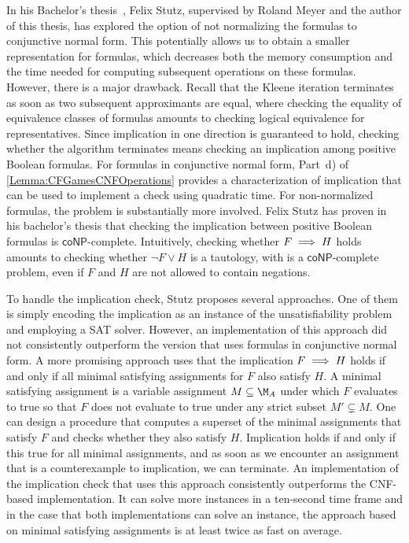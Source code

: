 \documentclass[../../diss.tex]{subfiles}
\begin{document}
In his Bachelor's thesis~\cite{Stutz17}, Felix Stutz, supervised by Roland Meyer and the author of this thesis, has explored the option of not normalizing the formulas to conjunctive normal form.
This potentially allows us to obtain a smaller representation for formulas, which decreases both the memory consumption and the time needed for computing subsequent operations on these formulas.
However, there is a major drawback.
Recall that the Kleene iteration terminates as soon as two subsequent approximants are equal, where checking the equality of equivalence classes of formulas amounts to checking logical equivalence for representatives.
Since implication in one direction is guaranteed to hold, checking whether the algorithm terminates means checking an implication among positive Boolean formulas.
For formulas in conjunctive normal form, Part~d) of \cref{Lemma:CFGamesCNFOperations} provides a characterization of implication that can be used to implement a check using quadratic time.
For non-normalized formulas, the problem is substantially more involved.
Felix Stutz has proven in his bachelor's thesis that checking the implication between positive Boolean formulas is $\mathsf{coNP}$-complete.
Intuitively, checking whether $F \implies H$ holds amounts to checking whether $\neg F \vee H$ is a tautology, with is a $\mathsf{coNP}$-complete problem, even if $F$ and $H$ are not allowed to contain negations.

To handle the implication check, Stutz proposes several approaches.
One of them is simply encoding the implication as an instance of the unsatisfiability problem and employing a SAT solver.
However, an implementation of this approach did not consistently outperform the version that uses formulas in conjunctive normal form.
A more promising approach uses that the implication $F \implies H$ holds if and only if all minimal satisfying assignments for $F$ also satisfy $H$.
A minimal satisfying assignment is a variable assignment $M \subseteq \nfatransmonoid{A}$ under which $F$ evaluates to true so that $F$ does not evaluate to true under any strict subset $M' \subsetneq M$.
One can design a procedure that computes a superset of the minimal assignments that satisfy $F$ and checks whether they also satisfy $H$.
Implication holds if and only if this true for all minimal assignments, and as soon as we encounter an assignment that is a counterexample to implication, we can terminate.
An implementation of the implication check that uses this approach consistently outperforms the CNF-based implementation.
It can solve more instances in a ten-second time frame and in the case that both implementations can solve an instance, the approach based on minimal satisfying assignments is at least twice as fast on average.
\end{document}
